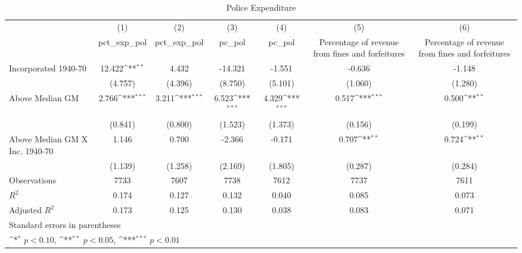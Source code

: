 \begin{table}[htbp]\centering
\def\sym#1{\ifmmode^{#1}\else\(^{#1}\)\fi}
\caption{Police Expenditure}
\begin{tabular}{l*{6}{c}}
\hline\hline
                    &\multicolumn{1}{c}{(1)}&\multicolumn{1}{c}{(2)}&\multicolumn{1}{c}{(3)}&\multicolumn{1}{c}{(4)}&\multicolumn{1}{c}{(5)}&\multicolumn{1}{c}{(6)}\\
                    &\multicolumn{1}{c}{pct\_exp\_pol}&\multicolumn{1}{c}{pct\_exp\_pol}&\multicolumn{1}{c}{pc\_pol}&\multicolumn{1}{c}{pc\_pol}&\multicolumn{1}{c}{Percentage of revenue from fines and forfeitures}&\multicolumn{1}{c}{Percentage of revenue from fines and forfeitures}\\
\hline
Incorporated 1940-70&      12.422\sym{**} &       4.432         &     -14.321         &      -1.551         &      -0.636         &      -1.148         \\
                    &     (4.757)         &     (4.396)         &     (8.750)         &     (5.101)         &     (1.060)         &     (1.280)         \\
[1em]
Above Median GM     &       2.766\sym{***}&       3.211\sym{***}&       6.523\sym{***}&       4.329\sym{***}&       0.517\sym{***}&       0.500\sym{**} \\
                    &     (0.841)         &     (0.800)         &     (1.523)         &     (1.373)         &     (0.156)         &     (0.199)         \\
[1em]
Above Median GM X Inc. 1940-70&       1.146         &       0.700         &      -2.366         &      -0.171         &       0.707\sym{**} &       0.724\sym{**} \\
                    &     (1.139)         &     (1.258)         &     (2.169)         &     (1.805)         &     (0.287)         &     (0.284)         \\
\hline
Observations        &        7733         &        7607         &        7738         &        7612         &        7737         &        7611         \\
\(R^{2}\)           &       0.174         &       0.127         &       0.132         &       0.040         &       0.085         &       0.073         \\
Adjusted \(R^{2}\)  &       0.173         &       0.125         &       0.130         &       0.038         &       0.083         &       0.071         \\
\hline\hline
\multicolumn{7}{l}{\footnotesize Standard errors in parentheses}\\
\multicolumn{7}{l}{\footnotesize \sym{*} \(p<0.10\), \sym{**} \(p<0.05\), \sym{***} \(p<0.01\)}\\
\end{tabular}
\end{table}
